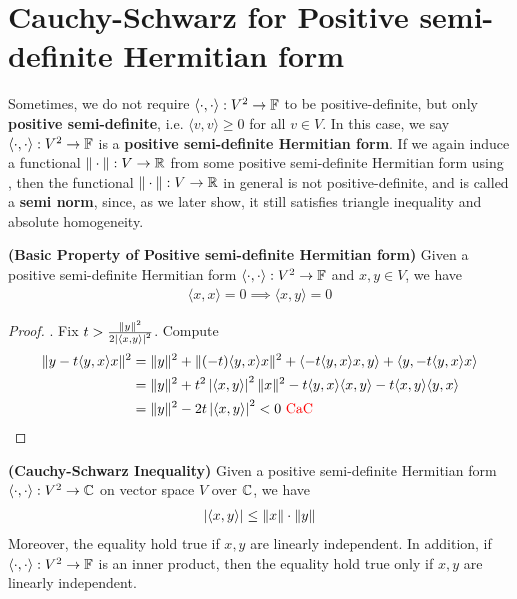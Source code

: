 \documentclass{report}
\begin{document}
\section{Cauchy-Schwarz for Positive semi-definite Hermitian form}
\begin{mdframed}
Sometimes, we do not require $\langle \cdot,\cdot\rangle :V^2\rightarrow \mathbb{F}$ to be positive-definite, but only \textbf{positive semi-definite}, i.e. $\langle v,v\rangle \geq 0$ for all $v\in V$. In this case, we say $\langle \cdot, \cdot\rangle :V^2\rightarrow \mathbb{F}$ is a \textbf{positive semi-definite Hermitian form}. If we again induce a functional $\| \cdot \|:V\rightarrow \mathbb{R}$ from some positive semi-definite Hermitian form using , then the functional $\| \cdot \|:V\rightarrow \mathbb{R}$ in general is not positive-definite, and is called a \textbf{semi norm}, since, as we later show, it still satisfies triangle inequality and absolute homogeneity.
\end{mdframed}
\begin{theorem}
\label{BPoP}
\textbf{(Basic Property of Positive semi-definite Hermitian form)} Given a positive semi-definite Hermitian form $\langle \cdot,\cdot\rangle:V^2 \rightarrow \mathbb{F}$ and $x,y \in V$, we have 
\begin{align*}
\langle x,x\rangle =0 \implies \langle x,y\rangle =0
\end{align*}
\end{theorem}
\begin{proof}
. Fix $t> \frac{\| y \|^2 }{2\left|\langle x,y\rangle \right|^2}$. Compute 
\begin{align*}
\| y-t\langle y,x\rangle x \|^2 &= \| y \|^2 + \| (-t)\langle y,x\rangle x  \|^2  + \langle -t\langle y,x\rangle x,y \rangle + \langle y,-t\langle y,x\rangle x\rangle \\
&=\| y \|^2 + t^2 \left|\langle x,y\rangle \right|^2 \| x \|^2 -t \langle y,x\rangle \langle x,y\rangle - t \langle x,y\rangle \langle y,x\rangle  \\
&= \| y \|^2- 2t \left|\langle x,y\rangle \right|^2 <0 \text{ \textcolor{red}{CaC} }
\end{align*}
\end{proof}
\begin{theorem}
\label{CSI}
\textbf{(Cauchy-Schwarz Inequality)} Given a positive semi-definite Hermitian form $\langle \cdot,\cdot\rangle :V^2\rightarrow \mathbb{C}$ on vector space $V$ over $\mathbb{C}$, we have
\begin{align*}
\left|\langle x,y\rangle \right|\leq \| x \|\cdot \| y \|
\end{align*}
Moreover, the equality hold true if $x,y$ are linearly independent. In addition, if $\langle \cdot,\cdot\rangle :V^2\rightarrow \mathbb{F}$ is an inner product, then the equality hold true only if $x,y$ are linearly independent.   
\end{theorem}
\end{document}
